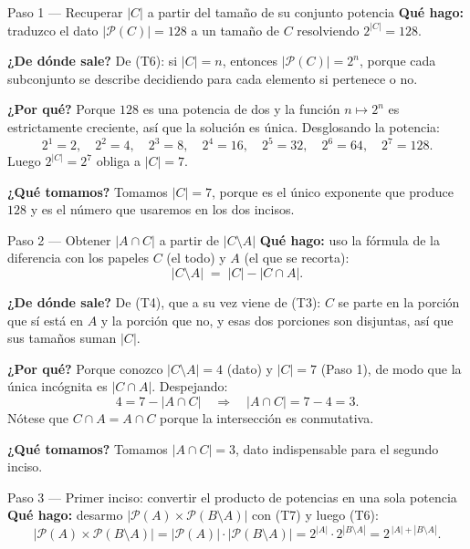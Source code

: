 \documentclass[11pt]{article}
\begin{document}
\begin{sol}

\begin{paso}{Paso 1 --- Recuperar $|C|$ a partir del tamaño de su conjunto potencia}
\textbf{Qué hago:} traduzco el dato $|\mathcal{P}(C)| = 128$ a un tamaño de $C$ resolviendo $2^{|C|} = 128$.

\textbf{¿De dónde sale?} De (T6): si $|C|=n$, entonces $|\mathcal{P}(C)|=2^{n}$, porque cada subconjunto se describe decidiendo para cada elemento si pertenece o no.

\textbf{¿Por qué?} Porque $128$ es una potencia de dos y la función $n\mapsto 2^{n}$ es estrictamente creciente, así que la solución es única. Desglosando la potencia:
\[
2^{1}=2,\quad 2^{2}=4,\quad 2^{3}=8,\quad 2^{4}=16,\quad 2^{5}=32,\quad 2^{6}=64,\quad 2^{7}=128 .
\]
Luego $2^{|C|} = 2^{7}$ obliga a $|C| = 7$.

\textbf{¿Qué tomamos?} Tomamos $|C| = 7$, porque es el único exponente que produce $128$ y es el número que usaremos en los dos incisos.
\end{paso}

\begin{paso}{Paso 2 --- Obtener $|A\cap C|$ a partir de $|C\setminus A|$}
\textbf{Qué hago:} uso la fórmula de la diferencia con los papeles $C$ (el todo) y $A$ (el que se recorta):
\[
|C\setminus A| \;=\; |C| - |C\cap A|.
\]

\textbf{¿De dónde sale?} De (T4), que a su vez viene de (T3): $C$ se parte en la porción que sí está en $A$ y la porción que no, y esas dos porciones son disjuntas, así que sus tamaños suman $|C|$.

\textbf{¿Por qué?} Porque conozco $|C\setminus A| = 4$ (dato) y $|C| = 7$ (Paso 1), de modo que la única incógnita es $|C\cap A|$. Despejando:
\[
4 = 7 - |A\cap C| \quad\Longrightarrow\quad |A\cap C| = 7 - 4 = 3.
\]
Nótese que $C\cap A = A\cap C$ porque la intersección es conmutativa.

\textbf{¿Qué tomamos?} Tomamos $|A\cap C| = 3$, dato indispensable para el segundo inciso.
\end{paso}

\begin{paso}{Paso 3 --- Primer inciso: convertir el producto de potencias en una sola potencia}
\textbf{Qué hago:} desarmo $|\mathcal{P}(A)\times \mathcal{P}(B\setminus A)|$ con (T7) y luego (T6):
\[
|\mathcal{P}(A)\times \mathcal{P}(B\setminus A)|
= |\mathcal{P}(A)|\cdot |\mathcal{P}(B\setminus A)|
= 2^{|A|}\cdot 2^{|B\setminus A|}
= 2^{\,|A| + |B\setminus A|}.
\]


\end{paso}
\end{sol}
\end{document}
